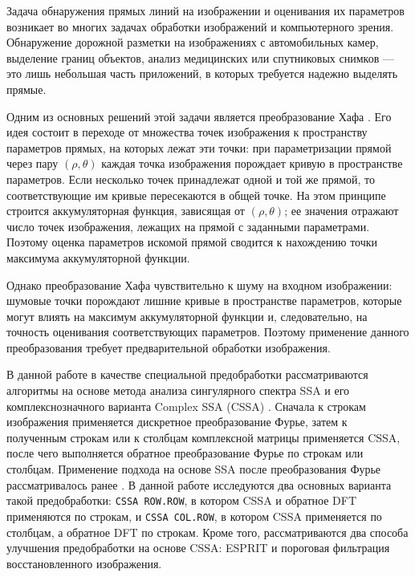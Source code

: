 ﻿%
\enlargethispage{2\baselineskip}

Задача обнаружения прямых линий на изображении и оценивания их параметров
возникает во многих задачах обработки изображений и компьютерного зрения. 
Обнаружение дорожной разметки на изображениях с автомобильных камер, 
выделение границ объектов, анализ медицинских или спутниковых снимков --- это лишь
небольшая часть приложений, в которых требуется надежно выделять прямые.

Одним из основных решений этой задачи является
преобразование Хафа \cite{duda1972hough}. Его идея состоит в переходе от
множества точек изображения к пространству параметров прямых, на которых
лежат эти точки: при параметризации прямой через пару $(\rho, \theta)$
каждая точка изображения порождает кривую в пространстве параметров. Если
несколько точек принадлежат одной и той же прямой, то соответствующие им
кривые пересекаются в общей точке. На этом принципе строится аккумуляторная
функция, зависящая от $(\rho, \theta)$; ее значения отражают число точек
изображения, лежащих на прямой с заданными параметрами. Поэтому оценка
параметров искомой прямой сводится к нахождению точки максимума аккумуляторной
функции.

Однако преобразование Хафа чувствительно к
шуму на входном изображении: шумовые точки порождают лишние кривые в
пространстве параметров, которые могут влиять на максимум аккумуляторной
функции и, следовательно, на точность оценивания соответствующих параметров.
Поэтому применение данного преобразования требует предварительной обработки
изображения.

В данной работе в качестве специальной предобработки рассматриваются алгоритмы
на основе метода анализа сингулярного спектра SSA и его комплекснозначного
варианта Complex SSA (CSSA) \cite{ts_structure,ssa_with_r,zhornikova2016}.
Сначала к строкам изображения применяется дискретное преобразование Фурье,
затем к полученным строкам или к столбцам комплексной матрицы
применяется CSSA, после чего выполняется обратное преобразование Фурье по
строкам или столбцам. Применение подхода на основе SSA после преобразования Фурье
рассматривалось ранее \cite{trickett2003}. В данной работе исследуются два
основных варианта такой предобработки: \texttt{CSSA ROW.ROW}, в котором CSSA и обратное DFT применяются по строкам, и
\texttt{CSSA COL.ROW}, в котором  CSSA применяется по столбцам, а обратное DFT по строкам. Кроме того, рассматриваются
два способа улучшения предобработки на основе CSSA: ESPRIT
\cite{ssa_with_r} и пороговая фильтрация восстановленного изображения.

